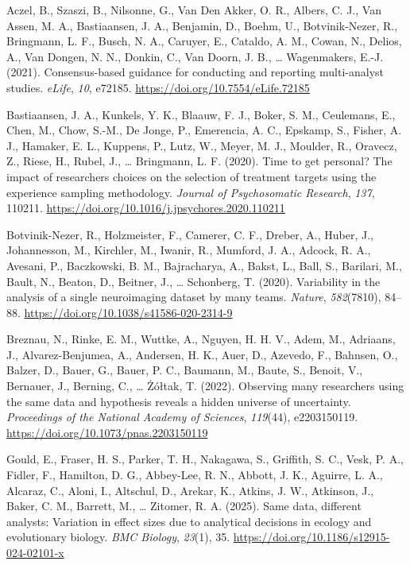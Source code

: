 \documentclass[
  man,
  floatsintext,
  longtable,
  nolmodern,
  notxfonts,
  notimes,
  colorlinks=true,linkcolor=blue,citecolor=blue,urlcolor=blue]{apa7}
\newlength{\cslhangindent}
\newenvironment{CSLReferences}[2] %
 {\begin{list}{}{%
  \setlength{\itemindent}{0pt}
  \setlength{\leftmargin}{0pt}
  \setlength{\parsep}{0pt}
  \ifodd #1
   \setlength{\leftmargin}{\cslhangindent}
   \setlength{\itemindent}{-1\cslhangindent}
  \fi
  \setlength{\itemsep}{#2\baselineskip}}}
 {\end{list}}
\begin{document}
\label{refs}
\begin{CSLReferences}{1}{0}
Aczel, B., Szaszi, B., Nilsonne, G., Van Den Akker, O. R., Albers, C.
J., Van Assen, M. A., Bastiaansen, J. A., Benjamin, D., Boehm, U.,
Botvinik-Nezer, R., Bringmann, L. F., Busch, N. A., Caruyer, E.,
Cataldo, A. M., Cowan, N., Delios, A., Van Dongen, N. N., Donkin, C.,
Van Doorn, J. B., \ldots{} Wagenmakers, E.-J. (2021). Consensus-based
guidance for conducting and reporting multi-analyst studies.
\emph{eLife}, \emph{10}, e72185.
\url{https://doi.org/10.7554/eLife.72185}

Bastiaansen, J. A., Kunkels, Y. K., Blaauw, F. J., Boker, S. M.,
Ceulemans, E., Chen, M., Chow, S.-M., De Jonge, P., Emerencia, A. C.,
Epskamp, S., Fisher, A. J., Hamaker, E. L., Kuppens, P., Lutz, W.,
Meyer, M. J., Moulder, R., Oravecz, Z., Riese, H., Rubel, J., \ldots{}
Bringmann, L. F. (2020). Time to get personal? {The} impact of
researchers choices on the selection of treatment targets using the
experience sampling methodology. \emph{Journal of Psychosomatic
Research}, \emph{137}, 110211.
\url{https://doi.org/10.1016/j.jpsychores.2020.110211}

Botvinik-Nezer, R., Holzmeister, F., Camerer, C. F., Dreber, A., Huber,
J., Johannesson, M., Kirchler, M., Iwanir, R., Mumford, J. A., Adcock,
R. A., Avesani, P., Baczkowski, B. M., Bajracharya, A., Bakst, L., Ball,
S., Barilari, M., Bault, N., Beaton, D., Beitner, J., \ldots{}
Schonberg, T. (2020). Variability in the analysis of a single
neuroimaging dataset by many teams. \emph{Nature}, \emph{582}(7810),
84--88. \url{https://doi.org/10.1038/s41586-020-2314-9}

Breznau, N., Rinke, E. M., Wuttke, A., Nguyen, H. H. V., Adem, M.,
Adriaans, J., Alvarez-Benjumea, A., Andersen, H. K., Auer, D., Azevedo,
F., Bahnsen, O., Balzer, D., Bauer, G., Bauer, P. C., Baumann, M.,
Baute, S., Benoit, V., Bernauer, J., Berning, C., \ldots{} Żółtak, T.
(2022). Observing many researchers using the same data and hypothesis
reveals a hidden universe of uncertainty. \emph{Proceedings of the
National Academy of Sciences}, \emph{119}(44), e2203150119.
\url{https://doi.org/10.1073/pnas.2203150119}

Gould, E., Fraser, H. S., Parker, T. H., Nakagawa, S., Griffith, S. C.,
Vesk, P. A., Fidler, F., Hamilton, D. G., Abbey-Lee, R. N., Abbott, J.
K., Aguirre, L. A., Alcaraz, C., Aloni, I., Altschul, D., Arekar, K.,
Atkins, J. W., Atkinson, J., Baker, C. M., Barrett, M., \ldots{}
Zitomer, R. A. (2025). Same data, different analysts: Variation in
effect sizes due to analytical decisions in ecology and evolutionary
biology. \emph{BMC Biology}, \emph{23}(1), 35.
\url{https://doi.org/10.1186/s12915-024-02101-x}


\end{CSLReferences}
\end{document}
